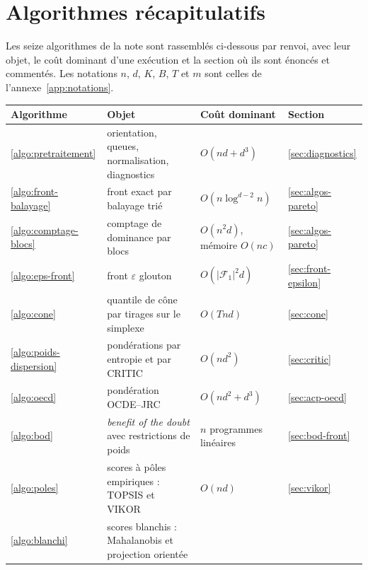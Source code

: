 \documentclass[11pt,a4paper]{article}
\theoremstyle{definition}
\theoremstyle{remark}
\newcommand{\abs}[1]{\left\lvert #1 \right\rvert}
\begin{document}
\section{Algorithmes récapitulatifs}
\label{app:algos}

\medskip

Les seize algorithmes de la note sont rassemblés ci-dessous par renvoi, avec leur objet, le
coût dominant d'une exécution et la section où ils sont énoncés et commentés. Les notations
$n$, $d$, $K$, $B$, $T$ et $m$ sont celles de l'annexe~\ref{app:notations}.

\medskip

\begin{table}[htbp]
  \centering
  \small
  \renewcommand{\arraystretch}{1.25}
  \begin{tabularx}{\textwidth}{@{}l Y l l@{}}
    \toprule
    \textbf{Algorithme} & \textbf{Objet} & \textbf{Coût dominant} & \textbf{Section} \\
    \midrule
    \ref{algo:pretraitement} & orientation, queues, normalisation, diagnostics
      & $O(nd + d^3)$ & \ref{sec:diagnostics} \\
    \ref{algo:front-balayage} & front exact par balayage trié
      & $O(n\log^{d-2} n)$ & \ref{sec:algos-pareto} \\
    \ref{algo:comptage-blocs} & comptage de dominance par blocs
      & $O(n^2 d)$, mémoire $O(nc)$ & \ref{sec:algos-pareto} \\
    \ref{algo:eps-front} & front $\varepsilon$ glouton \citep{laumanns2002}
      & $O(\abs{\mathcal{F}_1}^2 d)$ & \ref{sec:front-epsilon} \\
    \ref{algo:cone} & quantile de cône par tirages sur le simplexe
      & $O(Tnd)$ & \ref{sec:cone} \\
    \ref{algo:poids-dispersion} & pondérations par entropie et par CRITIC
      & $O(nd^2)$ & \ref{sec:critic} \\
    \ref{algo:oecd} & pondération OCDE--JRC
      & $O(nd^2 + d^3)$ & \ref{sec:acp-oecd} \\
    \ref{algo:bod} & \emph{benefit of the doubt} avec restrictions de poids
      & $n$ programmes linéaires & \ref{sec:bod-front} \\
    \ref{algo:poles} & scores à pôles empiriques : TOPSIS et VIKOR
      & $O(nd)$ & \ref{sec:vikor} \\
    \ref{algo:blanchi} & scores blanchis : Mahalanobis et projection orientée

\end{tabularx}
\end{table}
\end{document}
